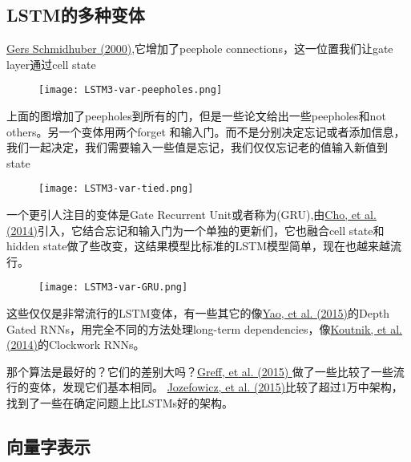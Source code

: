 \subsection{LSTM的多种变体}
\href{ftp://ftp.idsia.ch/pub/juergen/TimeCount-IJCNN2000.pdf}{Gers  Schmidhuber (2000)},它增加了peephole connections，这一位置我们让gate layer通过cell state
\begin{figure}
\centering
\texttt{[image: LSTM3-var-peepholes.png]}
\end{figure}
上面的图增加了peepholes到所有的门，但是一些论文给出一些peepholes和not others。另一个变体用两个forget 和输入门。而不是分别决定忘记或者添加信息，我们一起决定，我们需要输入一些值是忘记，我们仅仅忘记老的值输入新值到state
\begin{figure}
\centering
\texttt{[image: LSTM3-var-tied.png]}
\end{figure}
一个更引人注目的变体是Gate Recurrent Unit或者称为(GRU),由\href{http://arxiv.org/pdf/1406.1078v3.pdf}{Cho, et al. (2014)}引入，它结合忘记和输入门为一个单独的更新们，它也融合cell state和hidden state做了些改变，这结果模型比标准的LSTM模型简单，现在也越来越流行。
\begin{figure}
\centering
\texttt{[image: LSTM3-var-GRU.png]}
\end{figure}
这些仅仅是非常流行的LSTM变体，有一些其它的像\href{http://arxiv.org/pdf/1508.03790v2.pdf}{Yao, et al. (2015)}的Depth Gated RNNs，用完全不同的方法处理long-term dependencies，像\href{http://arxiv.org/pdf/1402.3511v1.pdf}{Koutnik, et al. (2014)}的Clockwork RNNs。\par
那个算法是最好的？它们的差别大吗？\href{http://arxiv.org/pdf/1503.04069.pdf}{Greff, et al. (2015) }做了一些比较了一些流行的变体，发现它们基本相同。
\href{http://jmlr.org/proceedings/papers/v37/jozefowicz15.pdf}{Jozefowicz, et al. (2015)}比较了超过1万中架构，找到了一些在确定问题上比LSTMs好的架构。
\subsection{向量字表示}
